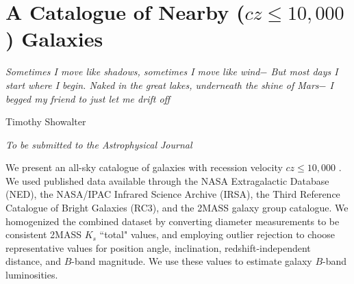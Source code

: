 \chapter[A Catalogue of Nearby ($cz \leq 10,000$ \kms) Galaxies]{A Catalogue of Nearby ($cz \leq 10,000$ \kms) Galaxies} 
\label{chap:chap2}


\vspace*{\fill}


\epigraph{\fixspacing\emph{Sometimes I move like shadows, sometimes I move like wind$-$
But most days I start where I begin.
Naked in the great lakes, underneath the shine of Mars$-$
I begged my friend to just let me drift off}}{Timothy Showalter}

\vspace*{\fill}


\begin{flushright}
  \fixspacing %
  \textit{To be submitted to the \emph{Astrophysical Journal}} \\
\end{flushright}

\vspace*{1in} %

\cleardoublepage


%
%
%
%
%
%
%
%
%
%
%
%
%
%


\begin{chabstract}
We present an all-sky catalogue of galaxies with recession velocity $cz \leq 10,000$ \kms. We used published data available through the NASA Extragalactic Database (NED), the NASA/IPAC Infrared Science Archive (IRSA), the Third Reference Catalogue of Bright Galaxies (RC3), and the \cite{tully2015} 2MASS galaxy group catalogue. We homogenized the combined dataset by converting diameter measurements to be consistent 2MASS $K_s$ ``total" values, and employing outlier rejection to choose representative values for position angle, inclination, redshift-independent distance, and $B$-band magnitude. We use these values to estimate galaxy $B$-band luminosities.


\end{chabstract}

